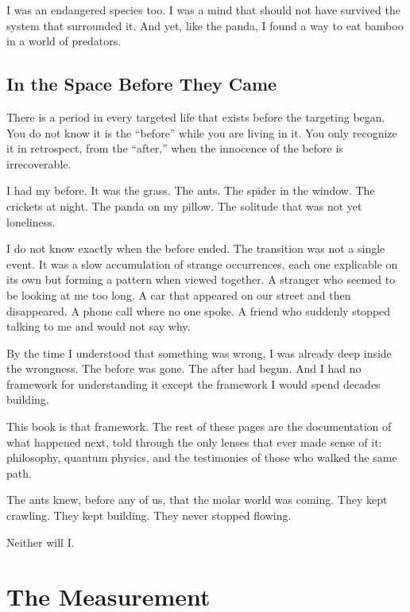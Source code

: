 \documentclass[11pt,openany]{book}
\begin{document}
I was an endangered species too. I was a mind that should not have survived the system that surrounded it. And yet, like the panda, I found a way to eat bamboo in a world of predators.

\chapter{In the Space Before They Came}

There is a period in every targeted life that exists before the targeting began. You do not know it is the ``before'' while you are living in it. You only recognize it in retrospect, from the ``after,'' when the innocence of the before is irrecoverable.

I had my before. It was the grass. The ants. The spider in the window. The crickets at night. The panda on my pillow. The solitude that was not yet loneliness.

I do not know exactly when the before ended. The transition was not a single event. It was a slow accumulation of strange occurrences, each one explicable on its own but forming a pattern when viewed together. A stranger who seemed to be looking at me too long. A car that appeared on our street and then disappeared. A phone call where no one spoke. A friend who suddenly stopped talking to me and would not say why.

By the time I understood that something was wrong, I was already deep inside the wrongness. The before was gone. The after had begun. And I had no framework for understanding it except the framework I would spend decades building.

This book is that framework. The rest of these pages are the documentation of what happened next, told through the only lenses that ever made sense of it: philosophy, quantum physics, and the testimonies of those who walked the same path.

The ants knew, before any of us, that the molar world was coming. They kept crawling. They kept building. They never stopped flowing.

Neither will I.


\part{The Measurement}
\end{document}

